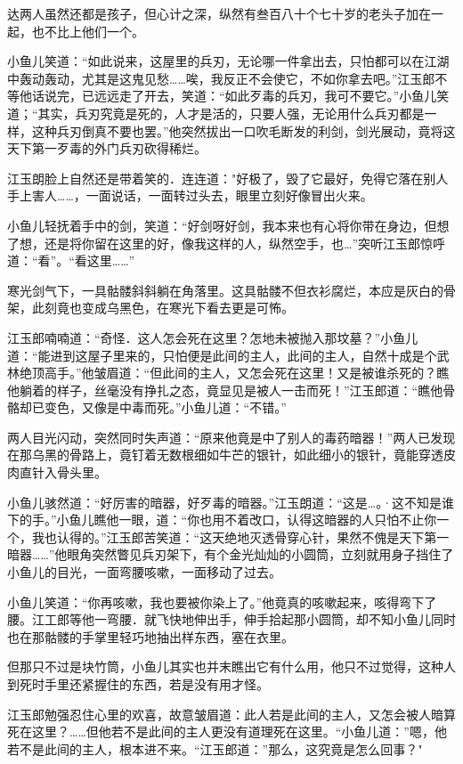 \documentclass[12pt,oneside]{book}
\begin{document}
达两人虽然还都是孩子，但心计之深，纵然有叁百八十个七十岁的老头子加在一起，也不比上他们一个。

小鱼儿笑道：``如此说来，这屋里的兵刃，无论哪一件拿出去，只怕都可以在江湖中轰动轰动，尤其是这鬼见愁\ldots\ldots 唉，我反正不会使它，不如你拿去吧。''江玉郎不等他话说完，已远远走了开去，笑道：``如此歹毒的兵刃，我可不要它。''小鱼儿笑道；``其实，兵刃究竟是死的，人才是活的，只要人强，无论用什么兵刃都是一样，这种兵刃倒真不要也罢。''他突然拔出一口吹毛断发的利剑，剑光展动，竟将这天下第一歹毒的外门兵刃砍得稀烂。

江玉朗脸上自然还是带着笑的．连连道："好极了，毁了它最好，免得它落在别人手上害人\ldots\ldots，一面说话，一面转过头去，眼里立刻好像冒出火来。

小鱼儿轻抚着手中的剑，笑道：``好剑呀好剑，我本来也有心将你带在身边，但想了想，还是将你留在这里的好，像我这样的人，纵然空手，也\ldots{}''突听江玉郎惊呼道：``看''。``看这里\ldots\ldots{}''

寒光剑气下，一具骷髅斜斜躺在角落里。这具骷髅不但衣衫腐烂，本应是灰白的骨架，此刻竟也变成乌黑色，在寒光下看去更是可怖。

江玉郎喃喃道：``奇怪．这人怎会死在这里？怎地未被抛入那坟墓？''小鱼儿道：``能进到这屋子里来的，只怕便是此间的主人，此间的主人，自然十成是个武林绝顶高手。''他皱眉道：``但此间的主人，又怎会死在这里！又是被谁杀死的？瞧他躺着的样子，丝毫没有挣扎之态，竟显见是被人一击而死！''江玉郎道：``瞧他骨骼却已变色，又像是中毒而死。''小鱼儿道：``不错。''

两人目光闪动，突然同时失声道：``原来他竟是中了别人的毒药暗器！''两人已发现在那乌黑的骨路上，竟钉着无数根细如牛芒的银针，如此细小的银针，竟能穿透皮肉直针入骨头里。

小鱼儿骇然道：``好厉害的暗器，好歹毒的暗器。''江玉朗道：``这是\ldots。·这不知是谁下的手。''小鱼儿瞧他一眼，道：``你也用不着改口，认得这暗器的人只怕不止你一个，我也认得的。''江玉郎苦笑道：``这天绝地灭透骨穿心针，果然不傀是天下第一暗器\ldots\ldots{}''他眼角突然瞥见兵刃架下，有个金光灿灿的小圆筒，立刻就用身子挡住了小鱼儿的目光，一面弯腰咳嗽，一面移动了过去。

小鱼儿笑道：``你再咳嗽，我也要被你染上了。''他竟真的咳嗽起来，咳得弯下了腰。江工郎等他一弯腰．就飞快地伸出手，伸手拾起那小圆筒，却不知小鱼儿同时也在那骷髅的手掌里轻巧地抽出样东西，塞在衣里。

但那只不过是块竹筒，小鱼儿其实也并末瞧出它有什么用，他只不过觉得，这种人到死时手里还紧握住的东西，若是没有用才怪。

江玉郎勉强忍住心里的欢喜，故意皱眉道：此人若是此间的主人，又怎会被人暗算死在这里？\ldots\ldots 但他若不是此间的主人更没有道理死在这里。``小鱼儿道：''嗯，他若不是此间的主人，根本进不来。``江玉郎道：''那么，这究竟是怎么回事？"
\end{document}
